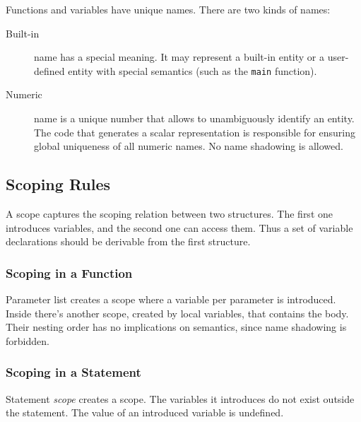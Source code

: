 \documentclass [a4paper] {article}
\begin{document}
Functions and variables have unique names. There are two kinds of names:

\begin {description}

\item [Built-in] name has a special meaning. It may represent a built-in
entity or a user-defined entity with special semantics (such as the
\texttt{main} function).

\item [Numeric] name is a unique number that allows to unambiguously identify an
entity. The code that generates a scalar representation is responsible for
ensuring global uniqueness of all numeric names. No name shadowing is allowed.

\end {description}

\subsection { Scoping Rules }

A scope captures the scoping relation between two structures. The first one
introduces variables, and the second one can access them. Thus a set of variable
declarations should be derivable from the first structure.

\subsubsection { Scoping in a Function }

Parameter list creates a scope where a variable per parameter is introduced.
Inside there's another scope, created by local variables, that contains the
body. Their nesting order has no implications on semantics, since name shadowing
is forbidden.

\subsubsection { Scoping in a Statement }

Statement \emph{scope} creates a scope. The variables it introduces do not exist
outside the statement. The value of an introduced variable is undefined.
\end{document}

